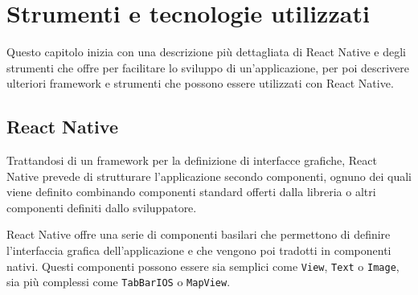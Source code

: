 
\chapter{Strumenti e tecnologie utilizzati}
\label{cap:strumenti-tecnologie}


Questo capitolo inizia con una descrizione più dettagliata di React Native e degli strumenti che offre per facilitare lo sviluppo di un'applicazione, per poi descrivere ulteriori framework e strumenti che possono essere utilizzati con React Native.

\section{React Native}

Trattandosi di un framework per la definizione di interfacce grafiche, React Native prevede di strutturare l'applicazione secondo componenti, ognuno dei quali viene definito combinando componenti standard offerti dalla libreria o altri componenti definiti dallo sviluppatore.

React Native offre una serie di componenti basilari che permettono di definire l'interfaccia grafica dell'applicazione e che vengono poi tradotti in componenti nativi. Questi componenti possono essere sia semplici come \texttt{View}, \texttt{Text} o \texttt{Image}, sia più complessi come \texttt{TabBarIOS} o \texttt{MapView}.


